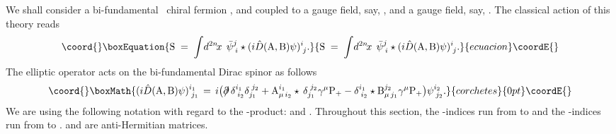 \documentclass[a4paper,12pt]{article}
\def\A{{\rm A}}
\def\B{{\rm B}}
\def\prslash{{\partial\mkern-9mu/}}
\def\prslash{{\partial\mkern-9mu/}}    %
\def\idxn{\int\! d^{2n}\!x \,}
\begin{document}
We shall consider  a bi-fundamental~\cite{Terashima:2000xq} chiral fermion
\coordHE{}, \coordHE{} and \coordHE{}  coupled  to a \coordHE{} gauge field, say,  \myHighlight{$\A_{\mu}$}\coordHE{}, 
and a \coordHE{} gauge field, say, \myHighlight{$\B_{\mu}$}\coordHE{}. The classical action of this
theory reads
\begin{equation}\coord{}\boxEquation{
{\rm S}\;=\;\idxn\; \bar{\psi}^{j}_{\;i}
\star(i\hat{D}(\A,\B)\psi)^{i}_{\;j}.
\label{biaction}
}{
{\rm S}\;=\;\idxn\; \bar{\psi}^{j}_{\;i}
\star(i\hat{D}(\A,\B)\psi)^{i}_{\;j}.
}{ecuacion}\coordE{}\end{equation}
The elliptic operator \myHighlight{$i\hat{D}(\A,\B)$}\coordHE{} acts on the bi-fundamental 
Dirac spinor \coordHE{} as follows
\begin{displaymath}\coord{}\boxMath{
(i\hat{D}(\A,\B)\psi)^{i_1}_{\; j_1}\,=\,i\big(
\prslash\,\delta^{i_1}_{\; i_2}\delta_{j_1}^{\; j_2}
+ \A^{i_1}_{\mu\,i_2}\star\,\delta_{j_1}^{\; j_2}\gamma^{\mu}{\rm P}_{+}
- \delta^{i_1}_{\; i_2} \star\B_{\mu\,j_1}^{j_2}\gamma^{\mu}{\rm P}_{+}\big)
\psi^{i_2}_{\; j_2}.
}{corchetes}{0pt}\coordE{}\end{displaymath}
We are using the following notation with regard to the \myHighlight{$\star$}\coordHE{}-product: 
\myHighlight{$\A_{\mu}\star\big)\psi\equiv \A_{\mu}\star\psi$}\coordHE{} and 
\myHighlight{$\star \B_{\mu}\big)\psi\equiv \psi \star \B_{\mu} $}\coordHE{}. Throughout this section, 
the \coordHE{}-indices run from \coordHE{} to \coordHE{} and the \coordHE{}-indices run from \coordHE{} to \coordHE{}. 
\myHighlight{$\A_{\mu}$}\coordHE{} and \myHighlight{$\B_{\mu}$}\coordHE{} are anti-Hermitian matrices.  
\end{document}
